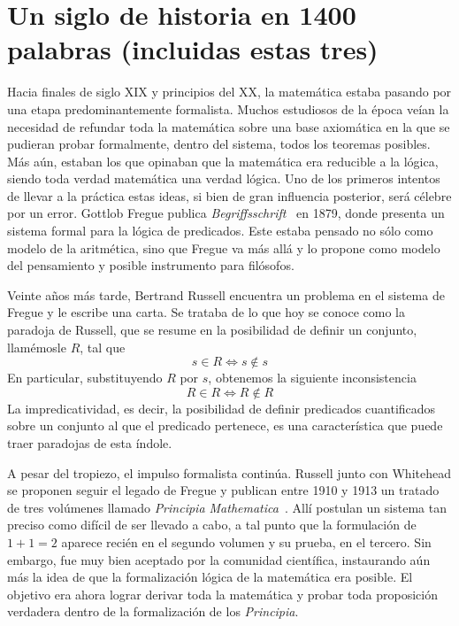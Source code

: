 \section*{Un siglo de historia en 1400 palabras (incluidas estas tres)}%

Hacia finales de siglo XIX y principios del XX, la matemática estaba pasando por una etapa predominantemente formalista. Muchos estudiosos de la época veían la necesidad de refundar toda la matemática sobre una base axiomática en la que se pudieran probar formalmente, dentro del sistema, todos los teoremas posibles. Más aún, estaban los que opinaban que la matemática era reducible a la lógica, siendo toda verdad matemática una verdad lógica. Uno de los primeros intentos de llevar a la práctica estas ideas, si bien de gran influencia posterior, será célebre por un error. Gottlob Fregue publica {\it Begriffsschrift}~ en 1879, donde presenta un sistema formal para la lógica de predicados. Este estaba pensado no sólo como modelo de la aritmética, sino que Fregue va más allá y lo propone como modelo del pensamiento y posible instrumento para filósofos.

Veinte años más tarde, Bertrand Russell encuentra un problema en el sistema de Fregue y le escribe una carta. Se trataba de lo que hoy se conoce como la paradoja de Russell, que se resume en la posibilidad de definir un conjunto, llamémosle $R$, tal que $$s \in R \Leftrightarrow s \notin s$$ En particular, substituyendo $R$ por $s$, obtenemos la siguiente inconsistencia $$R \in R \Leftrightarrow R \notin R$$
La impredicatividad, es decir, la posibilidad de definir predicados cuantificados sobre un conjunto al que el predicado pertenece, es una característica que puede traer paradojas de esta índole.

A pesar del tropiezo, el impulso formalista continúa. Russell junto con Whitehead se proponen seguir el legado de Fregue y publican entre 1910 y 1913 un tratado de tres volúmenes llamado {\it Principia Mathematica}~. Allí postulan un sistema tan preciso como difícil de ser llevado a cabo, a tal punto que la formulación de $1 + 1 = 2$ aparece recién en el segundo volumen y su prueba, en el tercero. Sin embargo, fue muy bien aceptado por la comunidad científica, instaurando aún más la idea de que la formalización lógica de la matemática era posible. El objetivo era ahora lograr derivar toda la matemática y probar toda proposición verdadera dentro de la formalización de los {\it Principia}.

